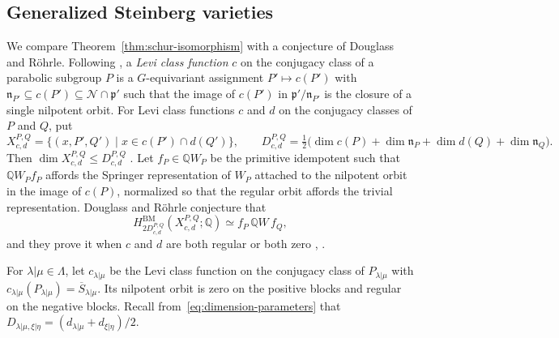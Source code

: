 \documentclass[11pt,a4paper]{amsart}
\theoremstyle{definition}
\theoremstyle{remark}
\newcommand{\Q}{\mathbb Q}
\newcommand{\N}{\mathcal N}
\newcommand{\BM}{\mathrm{BM}}
\newcommand{\lm}{\lambda|\mu}
\newcommand{\xh}{\xi|\eta}
\numberwithin{equation}{section}
\begin{document}
\subsection{Generalized Steinberg varieties}
\label{sec:DR}

We compare Theorem~\ref{thm:schur-isomorphism} with a conjecture of
Douglass and R\"ohrle. Following \cite[Section~2.4]{DRsurvey}, a
\emph{Levi class function} $c$ on the conjugacy class of a parabolic
subgroup $P$ is a $G$-equivariant assignment $P'\mapsto c(P')$ with
$\mathfrak n_{P'}\subseteq c(P')\subseteq\N\cap\mathfrak p'$ such that the
image of $c(P')$ in $\mathfrak p'/\mathfrak n_{P'}$ is the closure of a
single nilpotent orbit.
For Levi class functions $c$ and $d$ on the conjugacy classes of $P$
and $Q$, put
$$
X^{P,Q}_{c,d}=\{(x,P',Q')\mid x\in c(P')\cap d(Q')\},\qquad
D^{P,Q}_{c,d}=\tfrac12\bigl(\dim c(P)+\dim\mathfrak n_P
+\dim d(Q)+\dim\mathfrak n_Q\bigr).
$$
Then $\dim X^{P,Q}_{c,d}\le D^{P,Q}_{c,d}$ \cite[Corollary~2.6]{DR04}.
Let $f_P\in\Q W_P$ be the primitive idempotent such that $\Q W_Pf_P$
affords the Springer representation of $W_P$ attached to the nilpotent
orbit in the image of $c(P)$, normalized so that the regular orbit
affords the trivial representation. Douglass and R\"ohrle conjecture
\cite[Conjecture~3.19]{DRsurvey} that
\begin{equation}\label{eq:DR-conjecture}
H^{\BM}_{2D^{P,Q}_{c,d}}(X^{P,Q}_{c,d};\Q)\simeq f_P\,\Q W\,f_Q,
\end{equation}
and they prove it when $c$ and $d$ are both regular or both zero
\cite{DR}, \cite[(3.17), (3.18)]{DRsurvey}.

For $\lm\in\Lambda$, let $c_{\lm}$ be the Levi class function on the
conjugacy class of $P_{\lm}$ with $c_{\lm}(P_{\lm})=\overline S_{\lm}$.
Its nilpotent orbit is zero on the positive blocks and regular on the
negative blocks. Recall from~\eqref{eq:dimension-parameters} that
$D_{\lm,\xh}=(d_{\lm}+d_{\xh})/2$.
\end{document}
